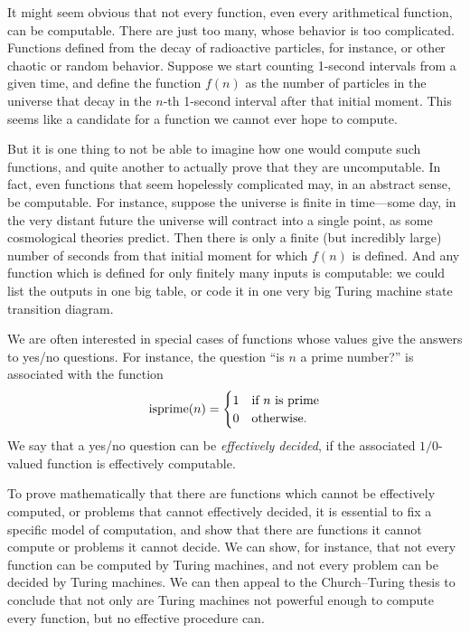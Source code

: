 \documentclass[../../../include/open-logic-section]{subfiles}
\begin{document}

It might seem obvious that not every function, even every arithmetical
function, can be computable. There are just too many, whose behavior
is too complicated.  Functions defined from the decay of radioactive
particles, for instance, or other chaotic or random behavior. Suppose
we start counting 1-second intervals from a given time, and define the
function $f(n)$ as the number of particles in the universe that decay
in the $n$-th 1-second interval after that initial moment.  This seems
like a candidate for a function we cannot ever hope to compute.

But it is one thing to not be able to imagine how one would compute
such functions, and quite another to actually prove that they are
uncomputable.  In fact, even functions that seem hopelessly
complicated may, in an abstract sense, be computable.  For instance,
suppose the universe is finite in time---some day, in the very distant
future the universe will contract into a single point, as some
cosmological theories predict. Then there is only a finite (but
incredibly large) number of seconds from that initial moment for which
$f(n)$ is defined.  And any function which is defined for only finitely
many inputs is computable: we could list the outputs in one big table,
or code it in one very big Turing machine state transition diagram.

We are often interested in special cases of functions whose values give
the answers to yes/no questions.  For instance, the question ``is $n$
a prime number?'' is associated with the function
\[
\mathrm{isprime}(n) = \begin{cases}
  1 & \text{if $n$ is prime}\\
  0 & \text{otherwise.}
  \end{cases}
\]
We say that a yes/no question can be \emph{effectively decided}, if
the associated $1/0$-valued function is effectively computable.

To prove mathematically that there are functions which cannot be
effectively computed, or problems that cannot effectively decided, it
is essential to fix a specific model of computation, and show
that there are functions it cannot compute or problems it cannot
decide.  We can show, for instance, that not every function can be
computed by Turing machines, and not every problem can be decided by
Turing machines.  We can then appeal to the Church--Turing thesis to
conclude that not only are Turing machines not powerful enough to
compute every function, but no effective procedure can.
\end{document}
